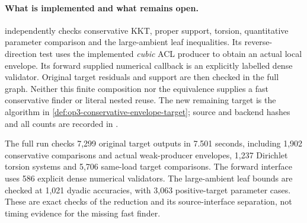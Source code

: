 \paragraph{What is implemented and what remains open.}
 independently checks
conservative KKT, proper support, torsion, quantitative parameter
comparison and the large-ambient leaf inequalities. Its reverse-direction
test uses the implemented \emph{cubic} ACL producer to obtain an actual
local envelope. Its forward supplied numerical callback is an explicitly
labelled dense validator. Original target residuals and support are then
checked in the full graph. Neither this finite composition nor the
equivalence supplies a fast conservative finder or literal nested reuse.
The new remaining target is the algorithm in
\cref{def:op3-conservative-envelope-target}; source and backend hashes
and all counts are recorded in .

The full run checks 7,299 original target outputs in 7.501 seconds,
including 1,902 conservative comparisons and actual weak-producer
envelopes, 1,237 Dirichlet torsion systems and 5,706 same-load target
comparisons. The forward interface uses 586 explicit dense numerical
validators. The large-ambient leaf bounds are checked at 1,021 dyadic
accuracies, with 3,063 positive-target parameter cases. These are exact
checks of the reduction and its source-interface separation, not timing
evidence for the missing fast finder.
